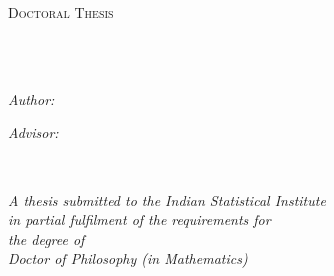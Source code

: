 \begin{titlepage}
	\begin{center}
		
		\vspace{.06\textheight}
		{\scshape\LARGE \Institute \par}\vspace{1.5cm} 
		\textsc{\Large Doctoral Thesis}\\[0.5cm] 

		\hrulefill \\[0.4cm]

		{\huge \bfseries \textcolor{indraBlue}{\ThesisTitle}\par}\vspace{0.2cm}
        \ifthenelse{\equal{\ThesisSubtitle}{}}{}{%
            {\Large \textit{\textcolor{indraBlue}{\ThesisSubtitle}}\par}\vspace{0.4cm}
        }
		\hrulefill \\[0.4cm]

		\begin{minipage}[t]{0.4\textwidth}
			\begin{flushleft} \large
				\emph{Author:}\\
				{\textcolor{indraBlue}{\Author}} 
			\end{flushleft}
		\end{minipage}
		\begin{minipage}[t]{0.4\textwidth}
			\begin{flushright} \large
				\emph{Advisor:} \\
				{\textcolor{indraBlue}{\PhdAdvisor}} 
			\end{flushright}
		\end{minipage}\\[1cm]

		\vfill

		\large \textit{A thesis submitted to the Indian Statistical Institute \\in partial fulfilment of the requirements for\\ the degree of \\
        Doctor of Philosophy (in Mathematics)}\\[1cm]

		\vfill

		\Large \Department\\[.25cm] \Institute
		\ifthenelse{\equal{\Centre}{}}{}{, \Centre}
		\\[2cm]

		{\large \ThesisYear}\\[4cm] 

		\vfill
	\end{center}
\end{titlepage}
